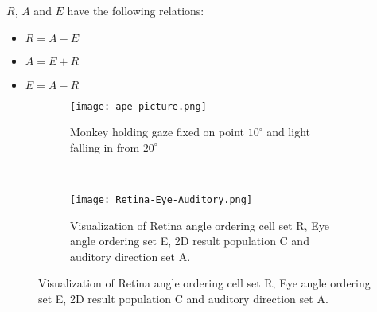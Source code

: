 \documentclass[main]{subfiles}
\begin{document}
$R$, $A$ and $E$ have the following relations:
\begin{itemize}
\item $R = A - E$
\item $A = E + R$
\item $E = A - R$
\end{itemize}

\begin{figure}[H]
	\centering
	\begin{subfigure}[b]{0.5\textwidth}
		\centering
		\texttt{[image: ape-picture.png]}
		\caption{Monkey holding gaze fixed on point $10^\circ$ and light falling in from $20^\circ$}
		\label{fig:APE}
	\end{subfigure}%
	~
	\begin{subfigure}[b]{0.5\textwidth}
		\centering
		\texttt{[image: Retina-Eye-Auditory.png]}
		\caption{Visualization of Retina angle ordering cell set R, Eye angle ordering set E, 2D result population C and auditory direction set A.}
		\label{fig:REA}
	\end{subfigure}
\end{figure}

%
\end{document}
